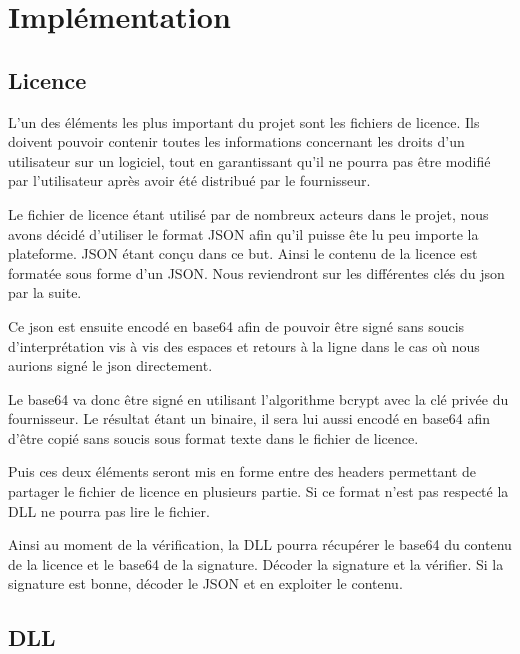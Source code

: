 \chapter{Implémentation}

\section{Licence}

L'un des éléments les plus important du projet sont les fichiers de licence.
\newline
Ils doivent pouvoir contenir toutes les informations concernant les droits d'un
utilisateur sur un logiciel, tout en garantissant qu'il ne pourra pas être 
modifié par l'utilisateur après avoir été distribué par le fournisseur.
\newline

Le fichier de licence étant utilisé par de nombreux acteurs dans le projet, 
nous avons décidé d'utiliser le format JSON afin qu'il puisse ête lu peu importe
la plateforme. JSON étant conçu dans ce but.
Ainsi le contenu de la licence est formatée sous forme d'un JSON. Nous reviendront
sur les différentes clés du json par la suite.
\newline

Ce json est ensuite encodé en base64 afin de pouvoir être signé sans soucis 
d'interprétation vis à vis des espaces et retours à la ligne dans le cas où nous 
aurions signé le json directement.
\newline

Le base64 va donc être signé en utilisant l'algorithme bcrypt avec la clé privée 
du fournisseur. Le résultat étant un binaire, il sera lui aussi encodé en base64 
afin d'être copié sans soucis sous format texte dans le fichier de licence. 
\newline

Puis ces deux éléments seront mis en forme entre des headers permettant de 
partager le fichier de licence en plusieurs partie. Si ce format n'est pas 
respecté la DLL ne pourra pas lire le fichier.
\newline

Ainsi au moment de la vérification, la DLL pourra récupérer le base64 du contenu 
de la licence et le base64 de la signature. Décoder la signature et la vérifier.
Si la signature est bonne, décoder le JSON et en exploiter le contenu.

\section{DLL}

